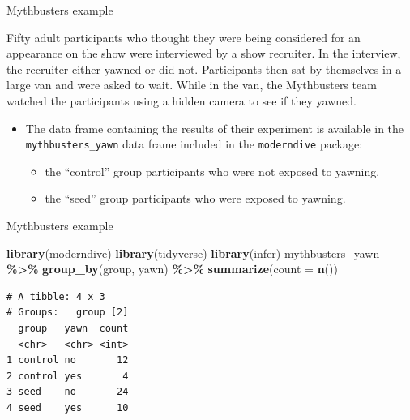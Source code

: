\documentclass[
  ignorenonframetext,
]{beamer}
\newenvironment{Shaded}{\begin{snugshade}}{\end{snugshade}}
\newcommand{\AttributeTok}[1]{\textcolor[rgb]{0.13,0.29,0.53}{#1}}
\newcommand{\FunctionTok}[1]{\textcolor[rgb]{0.13,0.29,0.53}{\textbf{#1}}}
\newcommand{\NormalTok}[1]{#1}
\newcommand{\SpecialCharTok}[1]{\textcolor[rgb]{0.81,0.36,0.00}{\textbf{#1}}}
\providecommand{\tightlist}{%
  \setlength{\itemsep}{0pt}\setlength{\parskip}{0pt}}
\begin{document}
\begin{frame}[fragile]{Mythbusters example}
\label{mythbusters-example}
\begin{tcolorbox}
Fifty adult participants who thought they were being considered for an appearance on the show were interviewed by a show recruiter. In the interview, the recruiter either yawned or did not. Participants then sat by themselves in a large van and were asked to wait. While in the van, the Mythbusters team watched the participants using a hidden camera to see if they yawned. 
\end{tcolorbox}

\begin{itemize}
\item
  The data frame containing the results of their experiment is available
  in the \texttt{mythbusters\_yawn} data frame included in the
  \texttt{moderndive} package:

  \begin{itemize}
  \tightlist
  \item
    the ``control'' group participants who were not exposed to yawning.
  \item
    the ``seed'' group participants who were exposed to yawning.
  \end{itemize}
\end{itemize}
\end{frame}

\begin{frame}[fragile]{Mythbusters example}
\label{mythbusters-example-1}
\small

\begin{Shaded}
\begin{Highlighting}[]
\FunctionTok{library}\NormalTok{(moderndive)}
\FunctionTok{library}\NormalTok{(tidyverse)}
\FunctionTok{library}\NormalTok{(infer)}
\NormalTok{mythbusters\_yawn }\SpecialCharTok{\%\textgreater{}\%} 
  \FunctionTok{group\_by}\NormalTok{(group, yawn) }\SpecialCharTok{\%\textgreater{}\%} 
  \FunctionTok{summarize}\NormalTok{(}\AttributeTok{count =} \FunctionTok{n}\NormalTok{())}
\end{Highlighting}
\end{Shaded}

\begin{verbatim}
# A tibble: 4 x 3
# Groups:   group [2]
  group   yawn  count
  <chr>   <chr> <int>
1 control no       12
2 control yes       4
3 seed    no       24
4 seed    yes      10
\end{verbatim}

\normalsize
\end{frame}
\end{document}
